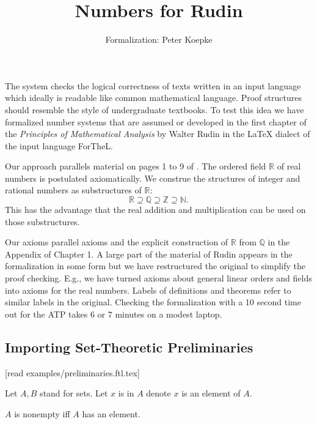 \documentclass{article}
\begin{document}
\title{Numbers for Rudin}

\author{\Naproche{} Formalization: Peter Koepke}

\maketitle

The \Naproche{} system checks the logical correctness of texts
written in an input language which ideally is readable
like common mathematical language. Proof structures should resemble the
style of undergraduate textbooks. To test this
idea we have formalized number systems that are
assumed or developed in the first chapter of the
\textit{Principles of Mathematical Analysis} by Walter Rudin
\cite{Rudin1953} in the {\LaTeX} dialect of the input language ForTheL.

Our approach parallels material
on pages 1 to 9 of \cite{Rudin1953}.
The ordered field $\mathbb{R}$ of real numbers
is postulated axiomatically. We construe the structures of integer and
rational numbers as substructures of $\mathbb{R}$:
\[ \mathbb{R} \supseteq \mathbb{Q} \supseteq \mathbb{Z}
\supseteq \mathbb{N}. \]
This has the advantage that the real addition and multiplication
can be used on those substructures.

Our axioms parallel axioms and the explicit construction of
$\mathbb{R}$ from $\mathbb{Q}$ in the Appendix of Chapter 1.
A large part of the
material of Rudin appears in the formalization in some form but
we have restructured the original to simplify the proof
checking. E.g., we have turned axioms about general
linear orders and fields into axioms for the real numbers.
Labels of definitions and theorems
refer to similar labels in the original.
Checking the formalization
with a 10 second time out for the ATP
takes 6 or 7 minutes on a modest laptop.


\subsection{Importing Set-Theoretic Preliminaries}

\begin{forthel}
[timelimit 10]

[read examples/preliminaries.ftl.tex]

Let $A,B$ stand for sets.
Let $x$ is in $A$ denote $x$ is an element of $A$.


\begin{definition}[title=1 3]
$A$ is nonempty iff $A$ has an element.
\end{definition}

\end{forthel}
\end{document}
